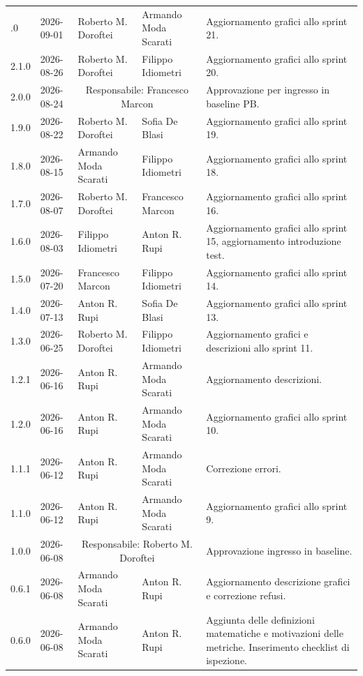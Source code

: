 \begin{longtable}{>{\ttfamily\small}l l l l p{4cm}}
	\bottomrule
	\endlastfoot
	2.2.0 & 2026-09-01 & {Roberto M. Doroftei} & {Armando Moda Scarati} & Aggiornamento grafici allo sprint 21. \\
	2.1.0 & 2026-08-26 & {Roberto M. Doroftei} & {Filippo Idiometri} & Aggiornamento grafici allo sprint 20. \\
	2.0.0 & 2026-08-24 & \multicolumn{2}{c}{Responsabile: Francesco Marcon} & Approvazione per ingresso in baseline PB. \\
	1.9.0 & 2026-08-22 & {Roberto M. Doroftei} & {Sofia De Blasi} &  Aggiornamento grafici allo sprint 19. \\
	1.8.0 & 2026-08-15 & {Armando Moda Scarati} & {Filippo Idiometri} &  Aggiornamento grafici allo sprint 18. \\
	1.7.0 & 2026-08-07 & {Roberto M. Doroftei} & {Francesco Marcon} &  Aggiornamento grafici allo sprint 16. \\
	1.6.0 & 2026-08-03 & {Filippo Idiometri} & {Anton R. Rupi} &  Aggiornamento grafici allo sprint 15, aggiornamento introduzione test. \\
	1.5.0 & 2026-07-20 & {Francesco Marcon} & {Filippo Idiometri} &  Aggiornamento grafici allo sprint 14. \\
	1.4.0 & 2026-07-13 & {Anton R. Rupi} & {Sofia De Blasi} &  Aggiornamento grafici allo sprint 13. \\
	1.3.0 & 2026-06-25 & {Roberto M. Doroftei} & {Filippo Idiometri} & Aggiornamento grafici e descrizioni allo sprint 11. \\
	1.2.1 & 2026-06-16 & {Anton R. Rupi} & {Armando Moda Scarati} & Aggiornamento descrizioni. \\
	1.2.0 & 2026-06-16 & {Anton R. Rupi} & {Armando Moda Scarati} & Aggiornamento grafici allo sprint 10. \\
	1.1.1 & 2026-06-12 & {Anton R. Rupi} & {Armando Moda Scarati} & Correzione errori. \\
	1.1.0 & 2026-06-12 & {Anton R. Rupi} & {Armando Moda Scarati} & Aggiornamento grafici allo sprint 9. \\
	1.0.0 & 2026-06-08 & \multicolumn{2}{c}{Responsabile: Roberto M. Doroftei} & Approvazione ingresso in baseline. \\
	0.6.1 & 2026-06-08 & {Armando Moda Scarati} & {Anton R. Rupi} & Aggiornamento descrizione grafici e correzione refusi. \\
	0.6.0 & 2026-06-08 & {Armando Moda Scarati} & {Anton R. Rupi} & Aggiunta delle definizioni matematiche e motivazioni delle metriche. Inserimento checklist di ispezione. \\

\end{longtable}
